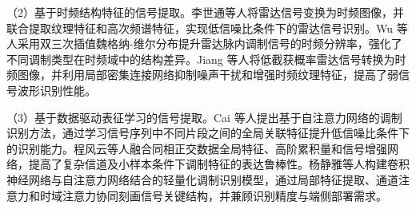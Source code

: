 （2）基于时频结构特征的信号提取。李世通等人\cite{Li2022RadarTFHOS}将雷达信号变换为时频图像，并联合提取纹理特征和高次频谱特征，实现低信噪比条件下的雷达信号识别。Wu 等人\cite{Wu2023BIWVD}采用双三次插值魏格纳-维尔分布提升雷达脉内调制信号的时频分辨率，强化了不同调制类型在时频域中的结构差异。Jiang 等人\cite{Jiang2022LPI}将低截获概率雷达信号转换为时频图像，并利用局部密集连接网络抑制噪声干扰和增强时频纹理特征，提高了弱信号波形识别性能。

（3）基于数据驱动表征学习的信号提取。Cai 等人\cite{Cai2022Transformer}提出基于自注意力网络的调制识别方法，通过学习信号序列中不同片段之间的全局关联特征提升低信噪比条件下的识别能力。程风云等人\cite{Cheng2024SignalEnhancement}融合同相正交数据全局特征、高阶累积量和信号增强网络，提高了复杂信道及小样本条件下调制特征的表达鲁棒性。杨静雅等人\cite{Yang2023CNNTransformerAMC}构建卷积神经网络与自注意力网络结合的轻量化调制识别模型，通过局部特征提取、通道注意力和时域注意力协同刻画信号关键结构，并兼顾识别精度与端侧部署需求。



